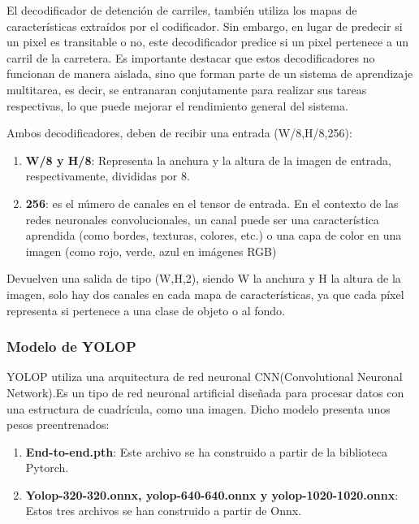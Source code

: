 El decodificador de detención de carriles, también utiliza los mapas de características extraídos 
por el codificador. Sin embargo, en lugar de predecir si un pixel es transitable o no, este decodificador
predice si un pixel pertenece a un carril de la carretera. \newline
Es importante destacar que estos decodificadores no funcionan de manera aislada, sino que forman parte
de un sistema de aprendizaje multitarea, es decir, se entranaran conjutamente para realizar sus tareas
respectivas, lo que puede mejorar el rendimiento general del sistema.\newline

Ambos decodificadores, deben de recibir una entrada (W/8,H/8,256): \newline 
\begin{enumerate}
  \item \textbf{W/8 y H/8}: Representa la anchura y la altura de la imagen de entrada, respectivamente, divididas por 8.
  \item \textbf{256}: es el número de 
  canales en el tensor de entrada. En el contexto de las redes neuronales convolucionales, 
  un canal puede ser una característica aprendida (como bordes, texturas, colores, etc.) o una capa de color en una imagen (como rojo, verde, azul en imágenes RGB)
\end{enumerate}

Devuelven una salida de tipo (W,H,2), siendo W la anchura y H la altura de la imagen, solo hay dos canales en cada mapa de características, ya que cada píxel 
representa si pertenece a una clase de objeto o al fondo. 

\subsubsection{Modelo de YOLOP}
\label{sec:Modelo_YOLOP}

YOLOP utiliza una arquitectura de red neuronal CNN(Convolutional Neuronal Network).Es un tipo de red neuronal artificial diseñada para procesar datos con una
estructura de cuadrícula, como una imagen. Dicho modelo presenta unos pesos preentrenados: 

\begin{enumerate}
  \item \textbf{End-to-end.pth}: Este archivo se ha construido a partir de la biblioteca Pytorch. 
  \item \textbf{Yolop-320-320.onnx, yolop-640-640.onnx y yolop-1020-1020.onnx}: Estos tres archivos se han construido a partir de Onnx.
\end{enumerate}

